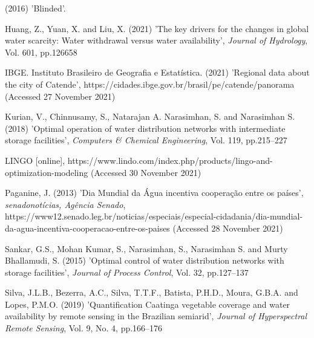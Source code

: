 \documentclass{singlecol}
\theoremstyle{TH}{
\newtheorem{lemma}{Lemma}
\newtheorem{theorem}[lemma]{Theorem}
\newtheorem{corrolary}[lemma]{Corrolary}
\newtheorem{conjecture}[lemma]{Conjecture}
\newtheorem{proposition}[lemma]{Proposition}
\newtheorem{claim}[lemma]{Claim}
\newtheorem{stheorem}[lemma]{Wrong Theorem}
\newtheorem{algorithm}{Algorithm}
}
\theoremstyle{THrm}{
\newtheorem{definition}{Definition}[section]
\newtheorem{question}{Question}[section]
\newtheorem{remark}{Remark}
\newtheorem{scheme}{Scheme}
}
\theoremstyle{THhit}{
\newtheorem{case}{Case}[section]
}
\begin{document}
\begin{thebibliography}{8}

(2016) 'Blinded'.


Huang, Z., Yuan, X. and  Liu, X. (2021) 'The key drivers for the changes in global water scarcity: Water withdrawal versus water availability', {\it Journal of Hydrology}, Vol. 601, pp.126658

IBGE. Instituto Brasileiro de Geografia e Estatística. (2021) 'Regional data about the city of Catende',
https://cidades.ibge.gov.br/brasil/pe/catende/panorama (Accessed 27 November 2021)

Kurian, V., Chinnusamy, S., Natarajan A. Narasimhan, S. and Narasimhan S. (2018) 'Optimal operation of water distribution networks with intermediate storage facilities', {\it Computers \& Chemical Engineering}, Vol. 119, pp.215--227

LINGO [online], https://www.lindo.com/index.php/products/lingo-and-optimization-modeling (Accessed 30 November 2021)

Paganine, J. (2013) 'Dia Mundial da Água incentiva cooperação entre os países', {\it senadonotícias, Agência Senado}, https://www12.senado.leg.br/noticias/especiais/especial-cidadania/dia-mundial-da-agua-incentiva-cooperacao-entre-os-paises (Accessed 28 November 2021)

Sankar, G.S., {Mohan Kumar}, S., Narasimhan, S., Narasimhan S. and {Murty Bhallamudi}, S. (2015) 'Optimal control of water distribution networks with storage facilities', {\it Journal of Process Control}, Vol. 32, pp.127--137

Silva, J.L.B., Bezerra, A.C., Silva, T.T.F., Batista, P.H.D., Moura, G.B.A. and  Lopes, P.M.O. (2019) 'Quantification Caatinga vegetable coverage and water availability by remote sensing in the Brazilian semiarid', {\it Journal of Hyperspectral Remote Sensing}, Vol. 9, No. 4, pp.166--176

\end{thebibliography}
\end{document}
